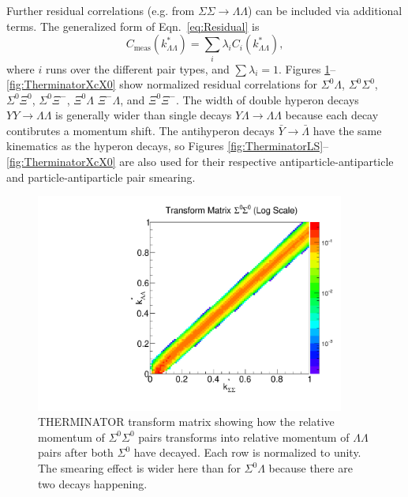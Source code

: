 Further residual correlations (e.g. from $\Sigma\Sigma \rightarrow \Lambda\Lambda$) can be included via additional terms.
The generalized form of Eqn.\ \ref{eq:Residual} is 
\begin{equation}
\label{eq:GeneralizedLambda}
C_{\mathrm{meas}}(k^*_{\Lambda\Lambda})= \sum_{i} \lambda_{i} C_{i}(k^*_{\Lambda\Lambda}),
\end{equation}
where $i$ runs over the different pair types, and $\sum \lambda_{i} = 1$.
Figures \ref{fig:TherminatorSS}--\ref{fig:TherminatorXcX0} show normalized residual correlations for $\Sigma^0\Lambda$, $\Sigma^0\Sigma^0$, $\Sigma^0\Xi^{0}$, $\Sigma^0\Xi^{-}$, $\Xi^0\Lambda$ $\Xi^{-}\Lambda$, and $\Xi^0\Xi^{-}$. 
The width of double hyperon decays $YY \rightarrow \Lambda\Lambda$ is generally wider than single decays $Y\Lambda \rightarrow \Lambda\Lambda$ because each decay contibrutes a momentum shift.
The antihyperon decays $\bar{Y} \rightarrow \bar{\Lambda}$ have the same kinematics as the hyperon decays, so Figures \ref{fig:TherminatorLS}--\ref{fig:TherminatorXcX0} are also used for their respective antiparticle-antiparticle and particle-antiparticle pair smearing.

\begin{figure}[hbtp]
\begin{center}
\includegraphics[width=24pc]{Figures/TransformMatrices/2016-7-20-TransformMatrixSigmaSigmaNormLog.pdf}
\end{center}
\caption[Transform matrix for $k^*_{\Sigma^0\Sigma^0} \rightarrow k^*_{\Lambda\Lambda}$]{THERMINATOR \cite{Chojnacki:2011hb} transform matrix showing how the relative momentum of $\Sigma^0\Sigma^0$ pairs transforms into relative momentum of $\Lambda\Lambda$ pairs after both $\Sigma^0$ have decayed. Each row is normalized to unity. The smearing effect is wider here than for $\Sigma^0\Lambda$ because there are two decays happening.}
\label{fig:TherminatorSS}
\end{figure}

